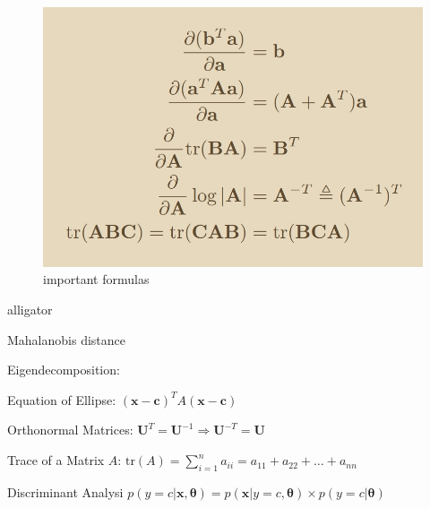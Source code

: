 \documentclass{article}
\begin{document}
\begin{figure}
    \centering
    \includegraphics[width=\textwidth]{formulas.jpg}
    \caption{important formulas}
    \label{formulas1}
\end{figure}
\begin{labeling}{alligator}
\item [Mahalanobis distance] 
\item [Eigendecomposition:]
\item [Equation of Ellipse:] $(\mathbf{x - c})^T A (\mathbf{x - c})$
\item [Orthonormal Matrices:] $\mathbf{U}^T = \mathbf{U}^{-1} \Rightarrow  \mathbf{U}^{-T} = \mathbf{U}$
\item [Trace of a Matrix $A$:] $\textrm{tr}(A)=\sum _{i=1}^{n}a_{ii}=a_{11}+a_{22}+\dots +a_{nn}$
\item [Discriminant Analysi] $p(y=c | \mathbf{x, \theta}) = p(\mathbf{x} | y = c, \mathbf{\theta}) \times p(y = c | \mathbf{\theta})$
\end{labeling}
\end{document}

